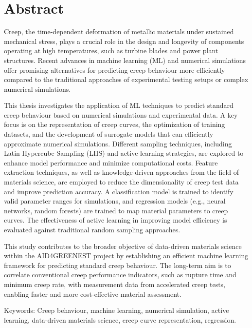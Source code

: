 \documentclass[class=scrbook, crop=false]{standalone}
\begin{document}
\chapter*{Abstract}
\label{Chapter::Abstract}
{
    \setlength{\parindent}{2em}
    \setlength{\parskip}{0em}

    Creep, the time-dependent deformation of metallic materials under sustained mechanical stress, plays a crucial role in the design and longevity of components operating at high temperatures, such as turbine blades and power plant structures. Recent advances in machine learning (ML) and numerical simulations offer promising alternatives for predicting creep behaviour more efficiently compared to the traditional approaches of experimental testing setups or complex numerical simulations.
           
    This thesis investigates the application of ML techniques to predict standard creep behaviour based on numerical simulations and experimental data. A key focus is on the representation of creep curves, the optimization of training datasets, and the development of surrogate models that can efficiently approximate numerical simulations. Different sampling techniques, including Latin Hypercube Sampling (LHS) and active learning strategies, are explored to enhance model performance and minimize computational costs. Feature extraction techniques, as well as knowledge-driven approaches from the field of materials science, are employed to reduce the dimensionality of creep test data and improve prediction accuracy. A classification model is trained to identify valid parameter ranges for simulations, and regression models (e.g., neural networks, random forests) are trained to map material parameters to creep curves. The effectiveness of active learning in improving model efficiency is evaluated against traditional random sampling approaches. 
    
    This study contributes to the broader objective of data-driven materials science within the AID4GREENEST project by establishing an efficient machine learning framework for predicting standard creep behaviour. The long-term aim is to correlate conventional creep performance indicators, such as rupture time and minimum creep rate, with measurement data from accelerated creep tests, enabling faster and more cost-effective material assessment.    
    
    \noindent Keywords: Creep behaviour, machine learning, numerical simulation, active learning, data-driven materials science, creep curve representation, regression.
}
\end{document}

